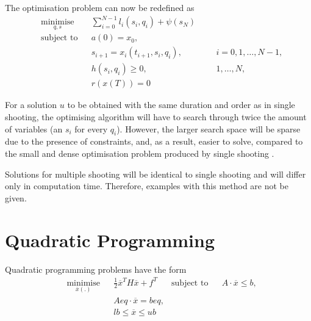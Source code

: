\par The optimisation problem can now be redefined as
\begin{equation}
    \label{eq:cost_mul_shoot}
    \begin{aligned}
    & \underset{q,s}{\text{minimise}} && \sum_{i=0}^{N-1} l_i(s_i,q_i) + \psi (s_N) \\
    & \text{subject to}  && a(0) = x_0, \\
        & && s_{i+1} = x_i (t_{i+1}, s_i, q_i), &&& i = 0,1,\dots, N-1, \\
        & && h(s_i,q_i) \geq 0, &&& 1,\dots,N, \\
        & && r(x(T)) = 0
    \end{aligned}
\end{equation}

\par For a solution $u$ to be obtained with the same duration and order as in single shooting, the optimising algorithm will have to search through twice the amount of variables (an $s_i$ for every $q_i$). However, the larger search space will be sparse due to the presence of constraints, and, as a result, easier to solve, compared to the small and dense optimisation problem produced by single shooting \cite{rao2009survey}.

\par Solutions for multiple shooting will be identical to single shooting and will differ only in computation time. Therefore, examples with this method are not be given.

\section{Quadratic Programming}

\par Quadratic programming problems have the form
\begin{equation}
    \label{eq:gen_quad_prog}
    \begin{aligned}
    & \underset{\overline{x}(.)}{\text{minimise}} && \frac{1}{2} \overline{x}^T H \overline{x} + f^T  
    & \text{subject to} && A \cdot \overline{x} \leq b, \\
    & && Aeq \cdot \overline{x} = beq, \\
    & && lb \leq \overline{x} \leq ub
    \end{aligned}
\end{equation} 

